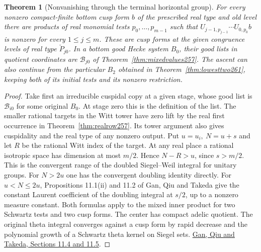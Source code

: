 \documentclass[a4paper,11pt]{article}
\newtheorem{theorem}[proposition]{Theorem}
\theoremstyle{definition}
\theoremstyle{remark}
\numberwithin{equation}{section}
\begin{document}
\begin{theorem}[Nonvanishing through the terminal horizontal group]\leavevmode
\label{thm:globalrow262}
For every nonzero compact-finite bottom cusp form \(b\) of the
prescribed real type and old level there are products of real
monomial tests \(p_0,\ldots,p_{m-1}\) such that
\(U_{j-1,p_{j-1}}\cdots U_{0,p_0}b\) is nonzero for every
\(1\le j\le m\). These are cusp forms at the given congruence
levels of real type \(\check P_{j0}\). In a bottom good Hecke
system \(B_0\), their good lists in quotient coordinates are
\(\mathcal B_{j0}\) of Theorem~\ref{thm:mixedvalues257}.
The ascent can also continue from the particular \(B_2\) obtained
in Theorem~\ref{thm:lowesttwo261}, keeping both of its initial
tests and its nonzero restriction.
\end{theorem}
\begin{proof}
Take first an irreducible cuspidal copy at a given stage, whose
good list is \(\mathcal B_{i0}\) for some original \(B_0\).
At stage zero this is the definition of the list. The smaller
rational targets in the Witt tower have zero lift by the real
first occurrence in Theorem~\ref{thm:realrow257}. Its tower
argument also gives cuspidality and the real type of any nonzero
output. Put \(u=u_i,\ N=u+s\) and let \(R\) be the rational
Witt index of the target. At any real place a rational isotropic
space has dimension at most \(m/2\). Hence \(N-R>u\), since
\(s>m/2\). This is the convergent range of the doubled
Siegel--Weil integral for unitary groups. For \(N>2u\) one has
the convergent doubling identity directly. For \(u<N\le2u\),
Propositions 11.1(ii) and 11.2 of Gan, Qiu and Takeda give
the constant Laurent coefficient of the doubling integral at
\(s/2\), up to a nonzero measure constant. Both formulas apply
to the mixed inner product for two Schwartz tests and two cusp
forms. The center has compact adelic quotient. The original
theta integral converges against a cusp form by rapid decrease
and the polynomial growth of a Schwartz theta kernel on Siegel
sets. \href{https://arxiv.org/pdf/1207.4709}{Gan, Qiu and
Takeda, Sections 11.4 and 11.5}.


\end{proof}
\end{document}
